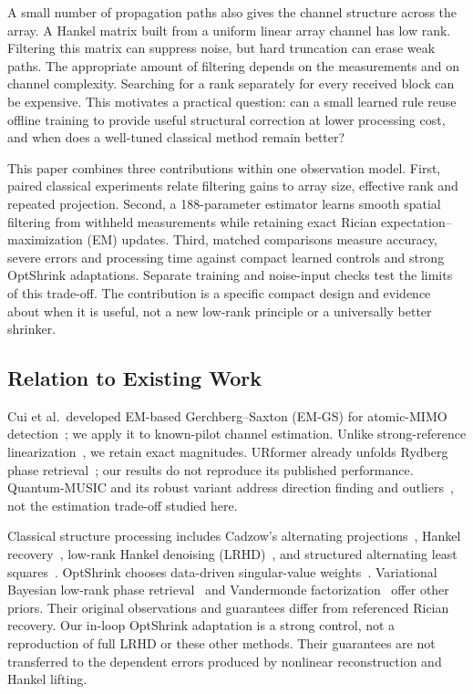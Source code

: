\documentclass[10pt,journal,letterpaper]{IEEEtran}
\begin{document}
A small number of propagation paths also gives the channel structure across the array. A Hankel matrix built from a uniform linear array channel has low rank. Filtering this matrix can suppress noise, but hard truncation can erase weak paths. The appropriate amount of filtering depends on the measurements and on channel complexity. Searching for a rank separately for every received block can be expensive. This motivates a practical question: can a small learned rule reuse offline training to provide useful structural correction at lower processing cost, and when does a well-tuned classical method remain better?

This paper combines three contributions within one observation model. First, paired classical experiments relate filtering gains to array size, effective rank and repeated projection. Second, a 188-parameter estimator learns smooth spatial filtering from withheld measurements while retaining exact Rician expectation--maximization (EM) updates. Third, matched comparisons measure accuracy, severe errors and processing time against compact learned controls and strong OptShrink adaptations. Separate training and noise-input checks test the limits of this trade-off. The contribution is a specific compact design and evidence about when it is useful, not a new low-rank principle or a universally better shrinker.

\subsection{Relation to Existing Work}
Cui et al.\ developed EM-based Gerchberg--Saxton (EM-GS) for atomic-MIMO detection~\cite{cui2025}; we apply it to known-pilot channel estimation. Unlike strong-reference linearization~\cite{xu2025}, we retain exact magnitudes. URformer already unfolds Rydberg phase retrieval~\cite{xiao2026}; our results do not reproduce its published performance. Quantum-MUSIC and its robust variant address direction finding and outliers~\cite{kim2025quantummusic,banerjee2026robust}, not the estimation trade-off studied here.

Classical structure processing includes Cadzow's alternating projections~\cite{cadzow1988}, Hankel recovery~\cite{chen2014emac}, low-rank Hankel denoising (LRHD)~\cite{yin2021}, and structured alternating least squares~\cite{zachariah2012}. OptShrink chooses data-driven singular-value weights~\cite{nadakuditi2014}. Variational Bayesian low-rank phase retrieval~\cite{liu2018lrpr} and Vandermonde factorization~\cite{ying2018hvaf} offer other priors. Their original observations and guarantees differ from referenced Rician recovery. Our in-loop OptShrink adaptation is a strong control, not a reproduction of full LRHD or these other methods. Their guarantees are not transferred to the dependent errors produced by nonlinear reconstruction and Hankel lifting.
\end{document}
